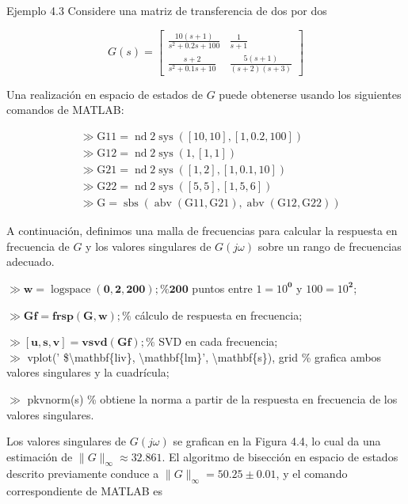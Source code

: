 Ejemplo 4.3 Considere una matriz de transferencia de dos por dos

$$
G(s)=\left[\begin{array}{cc}
\frac{10(s+1)}{s^{2}+0.2 s+100} & \frac{1}{s+1} \\
\frac{s+2}{s^{2}+0.1 s+10} & \frac{5(s+1)}{(s+2)(s+3)}
\end{array}\right]
$$

Una realización en espacio de estados de $G$ puede obtenerse usando los siguientes comandos de MATLAB:

$$
\begin{aligned}
& \gg \mathrm{G}11=\operatorname{nd}2\operatorname{sys}([10,10],[1,0.2,100]) \\
& \gg \mathrm{G}12=\operatorname{nd}2\operatorname{sys}(1,[1,1]) \\
& \gg \mathrm{G}21=\operatorname{nd}2\operatorname{sys}([1,2],[1,0.1,10]) \\
& \gg \mathrm{G}22=\operatorname{nd}2\operatorname{sys}([5,5],[1,5,6]) \\
& \gg \mathrm{G}=\operatorname{sbs}(\operatorname{abv}(\mathrm{G}11, \mathrm{G}21), \operatorname{abv}(\mathrm{G}12, \mathrm{G}22))
\end{aligned}
$$

A continuación, definimos una malla de frecuencias para calcular la respuesta en frecuencia de $G$ y los valores singulares de $G(j \omega)$ sobre un rango de frecuencias adecuado.

$\gg \mathbf{w}=\operatorname{logspace}(\mathbf{0},\mathbf{2},\mathbf{200}) ; \% \mathbf{200}$ puntos entre $1=10^{\mathbf{0}}$ y $100=10^{\mathbf{2}}$;

$\gg \mathbf{Gf}=\mathbf{frsp}(\mathbf{G}, \mathbf{w}) ; \%$ cálculo de respuesta en frecuencia;

$\gg[\mathbf{u}, \mathbf{s}, \mathbf{v}]=\mathbf{vsvd}(\mathbf{Gf}) ; \%$ SVD en cada frecuencia;\\
$\gg$ vplot(' \$\textbackslash mathbf\{liv\}, \textbackslash mathbf\{lm\}', \textbackslash mathbf\{s\}), grid \% grafica ambos valores singulares y la cuadrícula;

$\gg$ pkvnorm(s) \% obtiene la norma a partir de la respuesta en frecuencia de los valores singulares.

Los valores singulares de $G(j \omega)$ se grafican en la Figura 4.4, lo cual da una estimación de $\|G\|_{\infty} \approx 32.861$. El algoritmo de bisección en espacio de estados descrito previamente conduce a $\|G\|_{\infty}=50.25 \pm 0.01$, y el comando correspondiente de MATLAB es

